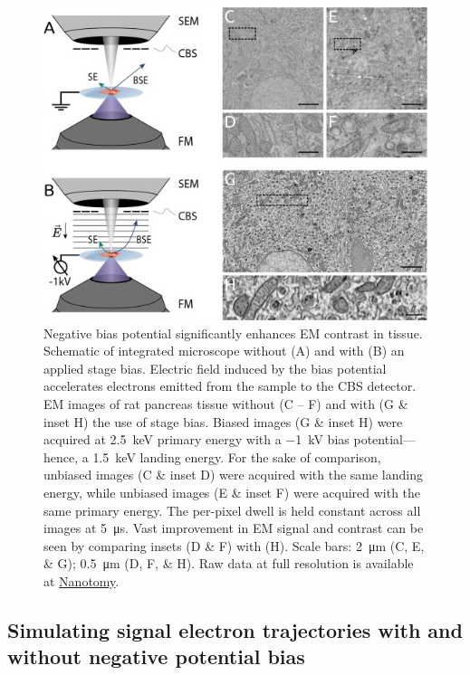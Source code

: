 \begin{figure}[!tbh]
    \centering
    \includegraphics[width=\linewidth]{chapter-2/figures_JPEG_LQ/fig2-1_setup.jpg}
    \caption{Negative bias potential significantly enhances EM contrast in tissue. Schematic of integrated microscope without (A) and with (B) an applied stage bias. Electric field induced by the bias potential accelerates electrons emitted from the sample to the CBS detector. EM images of rat pancreas tissue without (C -- F) and with (G \& inset H) the use of stage bias. Biased images (G \& inset H) were acquired at \SI{2.5}{\kilo\electronvolt} primary energy with a \SI{-1}{\kilo\volt} bias potential---hence, a \SI{1.5}{\kilo\electronvolt} landing energy. For the sake of comparison, unbiased images (C \& inset D) were acquired with the same landing energy, while unbiased images (E \& inset F) were acquired with the same primary energy. The per-pixel dwell is held constant across all images at \SI{5}{\micro\second}. Vast improvement in EM signal and contrast can be seen by comparing insets (D \& F) with (H). Scale bars: \SI{2}{\micro\meter} (C, E, \& G); \SI{0.5}{\micro\meter} (D, F, \& H). Raw data at full resolution is available at \href{www.nanotomy.org}{Nanotomy}.}
    \label{fig:2.1_setup}
\end{figure}


\subsection{Simulating signal electron trajectories with and without negative potential bias}

